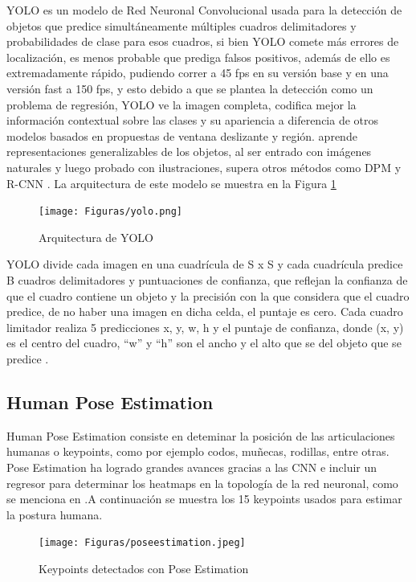 \documentclass[conference]{IEEEtran}
\begin{document}
YOLO es un modelo de Red Neuronal Convolucional usada para la detección de objetos que predice simultáneamente múltiples cuadros delimitadores y probabilidades de clase para esos cuadros, si bien YOLO comete más errores de localización, es menos probable que prediga falsos positivos, además de ello es extremadamente rápido, pudiendo correr a 45 fps en su versión base y en una versión fast a 150 fps, y esto debido a que se plantea la detección como un problema de regresión, YOLO ve la imagen completa, codifica mejor la información contextual sobre las clases y su apariencia a diferencia de otros modelos basados en propuestas de ventana deslizante y región. aprende representaciones generalizables de los objetos, al ser entrado con imágenes naturales y luego probado con ilustraciones, supera otros métodos como DPM y R-CNN \cite{redmon2018yolov3}. La arquitectura de este modelo se muestra en la Figura \ref{fig:yolo}

\begin{figure}[hbtp]
\centering
\texttt{[image: Figuras/yolo.png]}
\caption{Arquitectura de YOLO}
\label{fig:yolo}
\end{figure}

YOLO divide cada imagen en una cuadrícula de S x S y cada cuadrícula predice B cuadros delimitadores y puntuaciones de confianza, que reflejan la confianza de que el cuadro contiene un objeto y la precisión con la que considera que el cuadro predice, de no haber una imagen en dicha celda, el puntaje es cero. Cada cuadro limitador realiza 5 predicciones x, y, w, h y el puntaje de confianza, donde (x, y) es el centro del cuadro, “w” y “h” son el ancho y el alto que se del objeto que se predice \cite{redmon2018yolov3}.


\subsection{Human Pose Estimation}
Human Pose Estimation consiste en deteminar la posición de las articulaciones humanas o keypoints, como por ejemplo codos, muñecas, rodillas, entre otras. Pose Estimation ha logrado grandes avances gracias a las CNN e incluir un regresor para determinar los heatmaps en la topología de la red neuronal, como se menciona en \cite{bulat2016human}.A continuación se muestra los 15 keypoints usados para estimar la postura humana.

\begin{figure}[hbtp]
\centering
\texttt{[image: Figuras/poseestimation.jpeg]}
\caption{Keypoints detectados con Pose Estimation}
\label{fig:poseestimation}
\end{figure}
\end{document}
